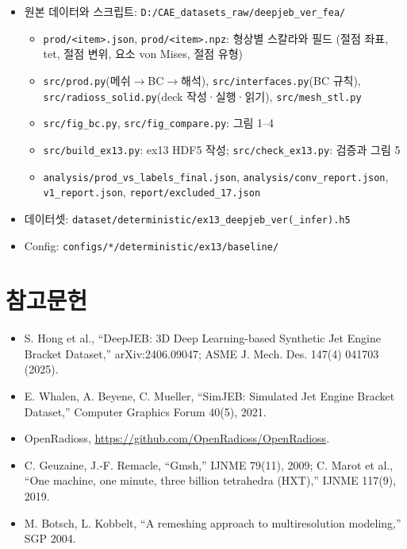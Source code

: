 \documentclass[11pt]{article}
\begin{document}
\begin{itemize}
\item 원본 데이터와 스크립트: \texttt{D:/CAE\_datasets\_raw/deepjeb\_ver\_fea/}
  \begin{itemize}
  \item \texttt{prod/<item>.json}, \texttt{prod/<item>.npz}: 형상별 스칼라와 필드
        (절점 좌표, tet, 절점 변위, 요소 von Mises, 절점 유형)
  \item \texttt{src/prod.py}(메쉬$\to$BC$\to$해석), \texttt{src/interfaces.py}(BC 규칙),
        \texttt{src/radioss\_solid.py}(deck 작성·실행·읽기), \texttt{src/mesh\_stl.py}
  \item \texttt{src/fig\_bc.py}, \texttt{src/fig\_compare.py}: 그림 1--4
  \item \texttt{src/build\_ex13.py}: ex13 HDF5 작성;
        \texttt{src/check\_ex13.py}: 검증과 그림 5
  \item \texttt{analysis/prod\_vs\_labels\_final.json}, \texttt{analysis/conv\_report.json},
        \texttt{v1\_report.json}, \texttt{report/excluded\_17.json}
  \end{itemize}
\item 데이터셋: \texttt{dataset/deterministic/ex13\_deepjeb\_ver(\_infer).h5}
\item Config: \texttt{configs/*/deterministic/ex13/baseline/}
\end{itemize}

\section*{참고문헌}
\begin{itemize}
\item S. Hong et al., ``DeepJEB: 3D Deep Learning-based Synthetic Jet Engine Bracket Dataset,''
      arXiv:2406.09047; ASME J. Mech. Des. 147(4) 041703 (2025).
\item E. Whalen, A. Beyene, C. Mueller, ``SimJEB: Simulated Jet Engine Bracket Dataset,''
      Computer Graphics Forum 40(5), 2021.
\item OpenRadioss, \url{https://github.com/OpenRadioss/OpenRadioss}.
\item C. Geuzaine, J.-F. Remacle, ``Gmsh,'' IJNME 79(11), 2009;
      C. Marot et al., ``One machine, one minute, three billion tetrahedra (HXT),'' IJNME 117(9), 2019.
\item M. Botsch, L. Kobbelt, ``A remeshing approach to multiresolution modeling,'' SGP 2004.
\end{itemize}
\end{document}
